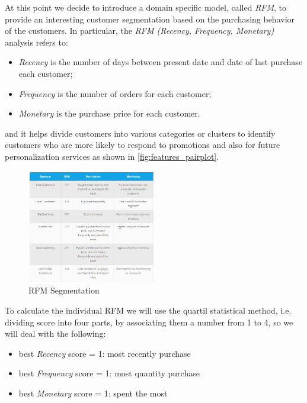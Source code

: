 At this point we decide to introduce a domain specific model, called \emph{RFM}, to provide an interesting customer segmentation based on the purchasing behavior of the customers. In particular, the \emph{RFM (Recency, Frequency, Monetary)} analysis refers to:

\begin{itemize}
\item \emph{Recency} is the number of days between present date and date of last purchase each customer;
\item \emph{Frequency} is the number of orders for each customer;
\item \emph{Monetary} is the purchase price for each customer.
\end{itemize}

and it helps divide customers into various categories or clusters to identify customers who are more likely to respond to promotions and also for future personalization services as shown in \ref{fig:features_pairplot}.

\begin{figure}[!h]
\centering
\includegraphics[width=0.5\textwidth]{img/preparation/rfm_seg.png}
\caption{RFM Segmentation}
\label{fig:rfm_seg}
\end{figure}

To calculate the individual RFM we will use the quartil statistical method, i.e. dividing score into four parts, by associating them a number from 1 to 4, so we will deal with the following:

\begin{itemize}
\item best \emph{Recency} score = 1: most recently purchase
\item best \emph{Frequency} score = 1: most quantity purchase
\item best \emph{Monetary} score = 1: spent the most
\end{itemize}

